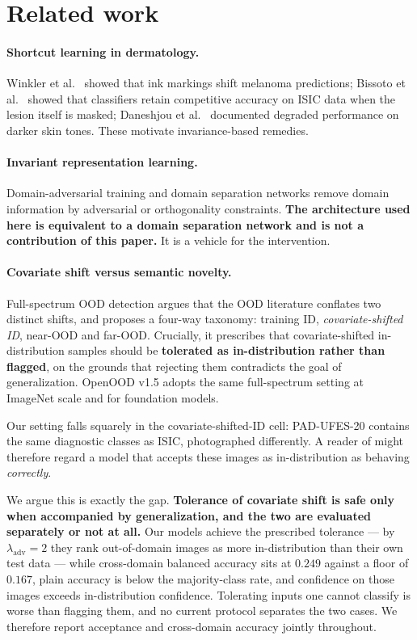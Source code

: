 \documentclass[11pt,a4paper]{article}
\newcommand{\lam}{\lambda_{\mathrm{adv}}}
\begin{document}
\section{Related work}

\paragraph{Shortcut learning in dermatology.}
Winkler et al.~\cite{winkler2019} showed that ink markings shift melanoma
predictions; Bissoto et al.~\cite{bissoto2020} showed that classifiers retain
competitive accuracy on ISIC data when the lesion itself is masked;
Daneshjou et al.~\cite{daneshjou2022} documented degraded performance on
darker skin tones. These motivate invariance-based remedies.

\paragraph{Invariant representation learning.}
Domain-adversarial training \cite{ganin2016} and domain separation networks
\cite{bousmalis2016} remove domain information by adversarial or
orthogonality constraints. \textbf{The architecture used here is
equivalent to a domain separation network and is not a contribution of this
paper.} It is a vehicle for the intervention.

\paragraph{Covariate shift versus semantic novelty.}
Full-spectrum OOD detection \cite{yang2023} argues that the OOD literature
conflates two distinct shifts, and proposes a four-way taxonomy: training ID,
\emph{covariate-shifted ID}, near-OOD and far-OOD. Crucially, it prescribes
that covariate-shifted in-distribution samples should be \textbf{tolerated as
in-distribution rather than flagged}, on the grounds that rejecting them
contradicts the goal of generalization. OpenOOD v1.5 \cite{zhang2023} adopts
the same full-spectrum setting at ImageNet scale and for foundation models.

Our setting falls squarely in the covariate-shifted-ID cell: PAD-UFES-20
contains the same diagnostic classes as ISIC, photographed differently. A
reader of \cite{yang2023} might therefore regard a model that accepts these
images as in-distribution as behaving \emph{correctly}.

We argue this is exactly the gap. \textbf{Tolerance of covariate shift is safe
only when accompanied by generalization, and the two are evaluated
separately or not at all.} Our models achieve the prescribed tolerance --- by
$\lam = 2$ they rank out-of-domain images as more in-distribution than their
own test data --- while cross-domain balanced accuracy sits at $0.249$ against
a floor of $0.167$, plain accuracy is below the majority-class rate, and
confidence on those images exceeds in-distribution confidence. Tolerating
inputs one cannot classify is worse than flagging them, and no current
protocol separates the two cases. We therefore report acceptance and
cross-domain accuracy jointly throughout.
\end{document}
